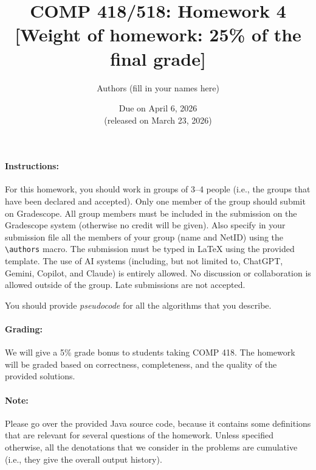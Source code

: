 \documentclass[11pt]{article}
\theoremstyle{definition}
\begin{document}
\title{COMP 418/518: Homework 4 \\[1ex] \large [Weight of homework: 25\% of the final grade]}
\author{Authors (fill in your names here)}
\date{Due on April 6, 2026 \\ \small (released on March 23, 2026)}

\maketitle

\paragraph{Instructions:}

For this homework, you should work in groups of 3--4 people (i.e., the groups that have been declared and accepted).
%
Only one member of the group should submit on Gradescope.
%
All group members must be included in the submission on the Gradescope system (otherwise no credit will be given).
%
Also specify in your submission file all the members of your group (name and NetID) using the \texttt{\textbackslash authors} macro.
%
The submission must be typed in LaTeX using the provided template.
%
The use of AI systems (including, but not limited to, ChatGPT, Gemini, Copilot, and Claude) is entirely allowed.
%
No discussion or collaboration is allowed outside of the group.
%
Late submissions are not accepted.

\begin{center}
	You should provide \emph{pseudocode} for all the algorithms that you describe.
\end{center}

\paragraph{Grading:}

We will give a 5\% grade bonus to students taking COMP 418. The homework will be graded based on correctness, completeness, and the quality of the provided solutions.

\paragraph{Note:}

Please go over the provided Java source code, because it contains some definitions that are relevant for several questions of the homework. Unless specified otherwise, all the denotations that we consider in the problems are cumulative (i.e., they give the overall output history).
\end{document}
